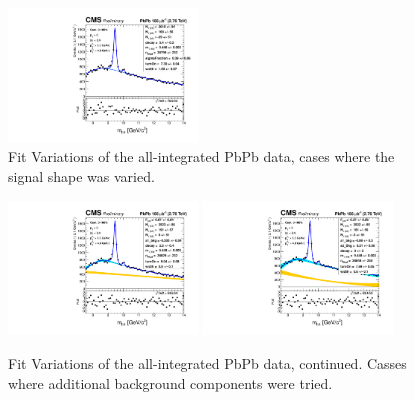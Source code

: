 \begin{figure}
\begin{center}
  \includegraphics[width=0.45\textwidth]{Chapters/aYield/PbPb/pt_3p5_4/Centrality/Cent_0_100/PbPb_Cent_0_100_fsr6.pdf}
 \caption{Fit Variations of the all-integrated PbPb data, cases where
   the signal shape was varied.}
 \label{fig:fitVar_AAMB-1}
\end{center}
\end{figure}


\begin{figure}
\begin{center}
  \includegraphics[width=0.45\textwidth]{Chapters/aYield/PbPb/pt_3p5_4/Centrality/Cent_0_100/PbPb_Cent_0_100_fsr1__bkg1.pdf}
  \includegraphics[width=0.45\textwidth]{Chapters/aYield/PbPb/pt_3p5_4/Centrality/Cent_0_100/PbPb_Cent_0_100_fsr1__bkg2.pdf}
 \caption{Fit Variations of the all-integrated PbPb data,
   continued. Casses where additional background components were
   tried.}
 \label{fig:fitVar_AAMB-2}
\end{center}
\end{figure}

\clearpage

